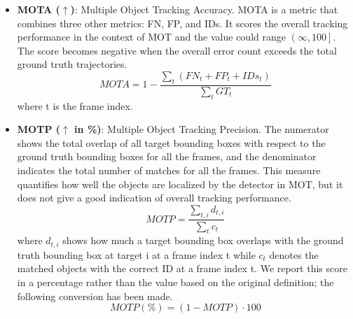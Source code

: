 \begin{itemize}
\item \textbf{MOTA ($\uparrow$)}: Multiple Object Tracking Accuracy. MOTA is a metric that combines three other metrics: FN, FP, and IDs. It scores the overall tracking performance in the context of MOT and the value could range $\left( \infty, 100 \right]$. The score becomes negative when the overall error count exceeds the total ground truth trajectories.
\begin{equation}
MOTA = 1 - \frac{\sum_{t} (FN_{t} + FP_{t} + IDs_{t})}{\sum_{t}GT_{t}}
\label{eqn:MOTA}
\end{equation}
where t is the frame index.

\item \textbf{MOTP ($\uparrow$ in \%)}: Multiple Object Tracking Precision. The numerator shows the total overlap of all target bounding boxes with respect to the ground truth bounding boxes for all the frames, and the denominator indicates the total number of matches for all the frames. This measure quantifies how well the objects are localized by the detector in MOT, but it does not give a good indication of overall tracking performance.
\begin{equation} 
MOTP = \frac{\sum_{t,i} d_{t,i}}{\sum_{t}c_{t}}
\label{eqn:MOTP}
\end{equation}
where $d_{t,i}$ shows how much a target bounding box overlaps with the ground truth bounding box at target i at a frame index t while $c_{t}$ denotes the matched objects with the correct ID at a frame index t. We report this score in a percentage rather than the value based on the original definition; the following conversion has been made.
\begin{equation} 
MOTP (\%) = (1 - MOTP) \cdot 100
\label{eqn:MOTP_percentage}
\end{equation}

\end{itemize}

